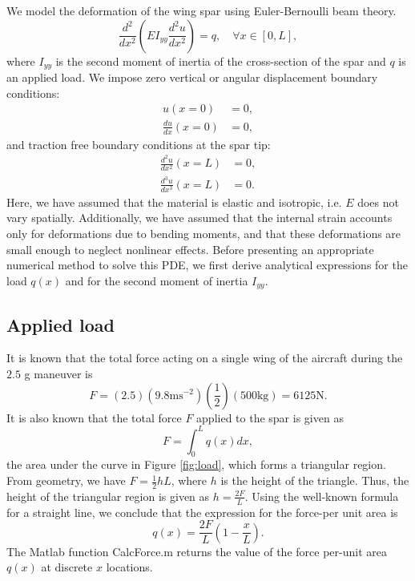 \documentclass[11pt]{article}
\begin{document}
We model the deformation of the wing spar using Euler-Bernoulli
beam theory.
\begin{equation}
\frac{d^2}{d x^2}
\left( E I_{yy} \frac{d^2 u}{dx^2} \right) =
q, \quad \forall x \in [0,L],
\label{eq:pde}
\end{equation}
where $I_{yy}$ is the second moment of inertia of the
cross-section of the spar and $q$ is an applied load.
We impose zero vertical or angular displacement boundary
conditions:
\begin{equation}
\begin{aligned}
u(x=0) &= 0, \\
\frac{du}{dx} (x=0) &= 0,
\end{aligned}
\end{equation}
and traction free boundary conditions at the spar tip:
\begin{equation}
\begin{aligned}
\frac{d^2 u}{dx^2} (x=L) &= 0, \\
\frac{d^3 u}{dx^3} (x=L) &= 0.
\end{aligned}
\end{equation}
Here, we have assumed that the material is elastic
and isotropic, i.e. $E$ does not vary spatially.
Additionally, we have assumed that the internal
strain accounts only for deformations due to
bending moments, and that these deformations are
small enough to neglect nonlinear effects.
Before presenting an appropriate numerical method to
solve this PDE, we first derive analytical expressions
for the load $q(x)$ and for the second moment of inertia
$I_{yy}$.

\subsection{Applied load}

It is known that the total force acting on a single wing
of the aircraft during the $2.5$ g maneuver is
\begin{equation}
F = (2.5)(9.8 \text{m}\text{s}^{-2})(\frac12)(500 \text{kg}) = 6125 \text{N}.
\end{equation}
It is also known that the total force $F$ applied to the
spar is given as
\begin{equation}
F = \int_0 ^L q(x) dx,
\end{equation}
the area under the curve in Figure \ref{fig:load}, which
forms a triangular region. From geometry, we have $F = \frac12 h L$,
where $h$ is the height of the triangle. Thus, the height
of the triangular region is given as $h = \frac{2F}{L}$.
Using the well-known formula for a straight line, we conclude that
the expression for the force-per unit area is
\begin{equation}
q(x) = \frac{2F}{L} \left( 1 - \frac{x}{L} \right).
\end{equation}
The Matlab function CalcForce.m returns the value
of the force per-unit area $q(x)$ at discrete $x$
locations.
\end{document}
